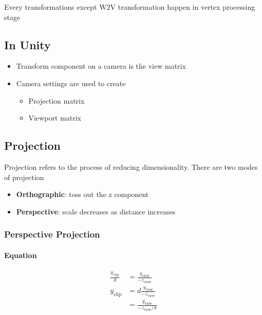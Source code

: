   Every transformations except W2V transformation happen in vertex
  processing stage

  \subsection{In Unity}

    \begin{itemize}
      \item Transform component on a camera is the view matrix
      \item Camera settings are used to create
      \begin{itemize}
        \item Projection matrix
        \item Viewport matrix
      \end{itemize}
    \end{itemize}

  \subsection{Projection}

    Projection refers to the process of reducing dimensionality. There are two
    modes of projection

    \begin{itemize}
      \item \textbf{Orthographic}: toss out the z component
      \item \textbf{Perspective}: scale decreases as distance increases
    \end{itemize}

    \subsubsection{Perspective Projection}

      \paragraph{Equation}
      \begin{align}
        \frac{y_{\text{clip}}}{d} &= \frac{y_{\text{view}}}{-z_{\text{view}}} \\
        y_{\text{clip}}
        &= d\frac{y_ {\text{view}}}{-z_{\text{view}}} \\
        &= \frac{y_{\text{view}}}{-z_{\text{view}} / d}
      \end{align}

